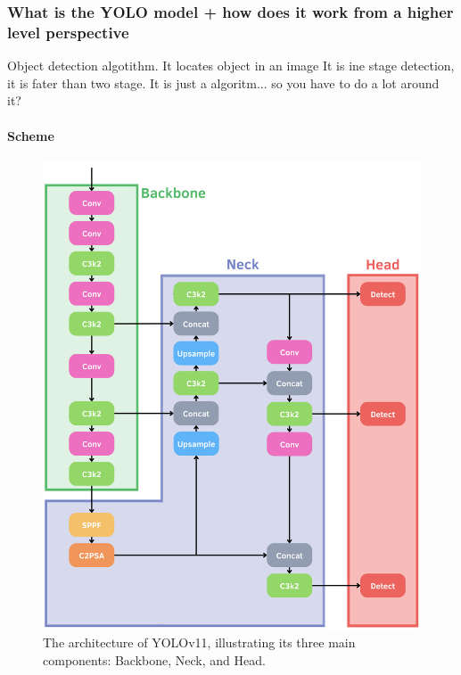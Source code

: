 \documentclass[a4paper,10pt,twocolumn]{article}
\numberwithin{figure}{section}
\numberwithin{table}{section}
\begin{document}
\subsubsection{What is the YOLO model + how does it work from a higher level perspective}
\vspace{0.3cm}

Object detection algotithm. It locates object in an image
It is ine stage detection, it is fater than two stage. 
It is just a algoritm... so you have to do a lot around it?

\paragraph{Scheme}


\begin{figure}[h]
    \centering
    \includegraphics[width=1\linewidth]{YOLOARC.png}  %
    \caption{The architecture of YOLOv11, illustrating its three main components: Backbone, Neck, and Head.}
    \label{fig:Arc}  
\end{figure}
\end{document}

